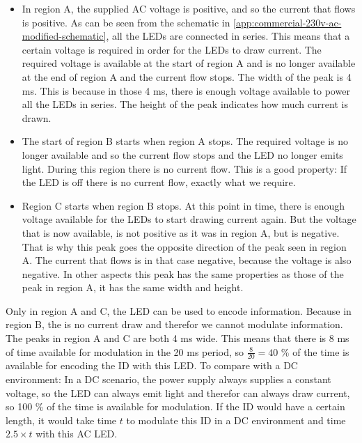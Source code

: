 \begin{itemize}
	\item In region A, the supplied AC voltage is positive, and so the current that flows is positive.
	As can be seen from the schematic in \autoref{app:commercial-230v-ac-modified-schematic}, all the LEDs are connected in series.
	This means that a certain voltage is required in order for the LEDs to draw current.
	The required voltage is available at the start of region A and is no longer available at the end of region A and the current flow stops.
	The width of the peak is 4 ms.
	This is because in those 4 ms, there is enough voltage available to power all the LEDs in series. 
	The height of the peak indicates how much current is drawn.

	\item The start of region B starts when region A stops.
	The required voltage is no longer available and so the current flow stops and the LED no longer emits light.
	During this region there is no current flow.
	This is a good property: If the LED is off there is no current flow, exactly what we require.

	\item Region C starts when region B stops.
	At this point in time, there is enough voltage available for the LEDs to start drawing current again.
	But the voltage that is now available, is not positive as it was in region A, but is negative.
	That is why this peak goes the opposite direction of the peak seen in region A.
	The current that flows is in that case negative, because the voltage is also negative.
	In other aspects this peak has the same properties as those of the peak in region A, it has the same width and height.

\end{itemize}


Only in region A and C, the LED can be used to encode information.
Because in region B, the is no current draw and therefor we cannot modulate information.
The peaks in region A and C are both 4 ms wide.
This means that there is 8 ms of time available for modulation in the 20 ms period, so $\frac{8}{20} = 40$ \% of the time is available for encoding the ID with this LED.
To compare with a DC environment: In a DC scenario, the power supply always supplies a constant voltage, so the LED can always emit light and therefor can always draw current, so 100 \% of the time is available for modulation.
If the ID would have a certain length, it would take time $t$ to modulate this ID in a DC environment and time $2.5 \times t$ with this AC LED. 


